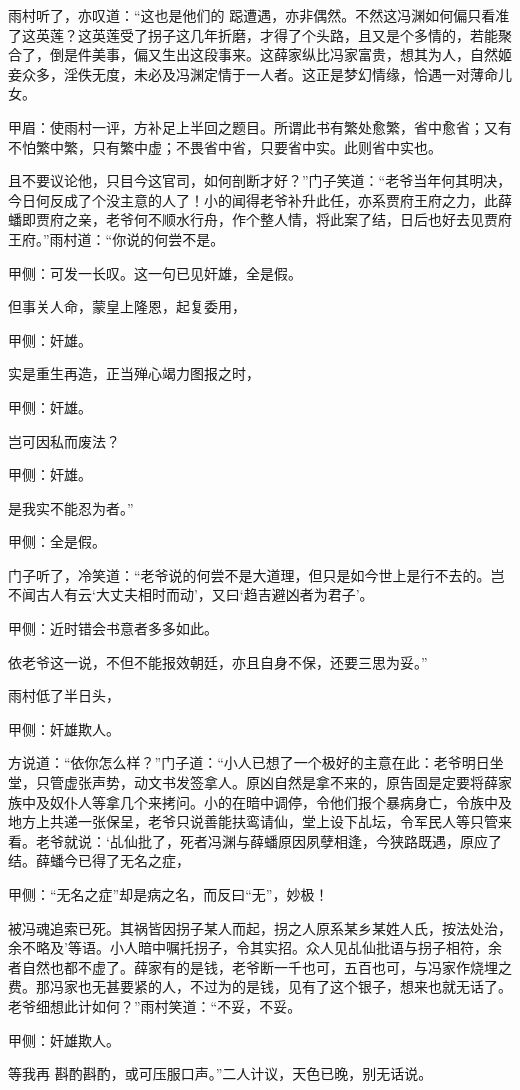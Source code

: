 \begin{parag}
    雨村听了，亦叹道：“这也是他们的 跽遭遇，亦非偶然。不然这冯渊如何偏只看准了这英莲？这英莲受了拐子这几年折磨，才得了个头路，且又是个多情的，若能聚合了，倒是件美事，偏又生出这段事来。这薛家纵比冯家富贵，想其为人，自然姬妾众多，淫佚无度，未必及冯渊定情于一人者。这正是梦幻情缘，恰遇一对薄命儿女。\begin{note}甲眉：使雨村一评，方补足上半回之题目。所谓此书有繁处愈繁，省中愈省；又有不怕繁中繁，只有繁中虚；不畏省中省，只要省中实。此则省中实也。\end{note}且不要议论他，只目今这官司，如何剖断才好？”门子笑道：“老爷当年何其明决，今日何反成了个没主意的人了！小的闻得老爷补升此任，亦系贾府王府之力，此薛蟠即贾府之亲，老爷何不顺水行舟，作个整人情，将此案了结，日后也好去见贾府王府。”雨村道：“你说的何尝不是。\begin{note}甲侧：可发一长叹。这一句已见奸雄，全是假。\end{note}但事关人命，蒙皇上隆恩，起复委用，\begin{note}甲侧：奸雄。\end{note}实是重生再造，正当殚心竭力图报之时，\begin{note}甲侧：奸雄。\end{note}岂可因私而废法？\begin{note}甲侧：奸雄。\end{note}是我实不能忍为者。”\begin{note}甲侧：全是假。\end{note}门子听了，冷笑道：“老爷说的何尝不是大道理，但只是如今世上是行不去的。岂不闻古人有云‘大丈夫相时而动’，又曰‘趋吉避凶者为君子’。\begin{note}甲侧：近时错会书意者多多如此。\end{note}依老爷这一说，不但不能报效朝廷，亦且自身不保，还要三思为妥。”
\end{parag}


\begin{parag}
    雨村低了半日头，\begin{note}甲侧：奸雄欺人。\end{note}方说道：“依你怎么样？”门子道：“小人已想了一个极好的主意在此：老爷明日坐堂，只管虚张声势，动文书发签拿人。原凶自然是拿不来的，原告固是定要将薛家族中及奴仆人等拿几个来拷问。小的在暗中调停，令他们报个暴病身亡，令族中及地方上共递一张保呈，老爷只说善能扶鸾请仙，堂上设下乩坛，令军民人等只管来看。老爷就说：‘乩仙批了，死者冯渊与薛蟠原因夙孽相逢，今狭路既遇，原应了结。薛蟠今已得了无名之症，\begin{note}甲侧：“无名之症”却是病之名，而反曰“无”，妙极！\end{note}被冯魂追索已死。其祸皆因拐子某人而起，拐之人原系某乡某姓人氏，按法处治，余不略及’等语。小人暗中嘱托拐子，令其实招。众人见乩仙批语与拐子相符，余者自然也都不虚了。薛家有的是钱，老爷断一千也可，五百也可，与冯家作烧埋之费。那冯家也无甚要紧的人，不过为的是钱，见有了这个银子，想来也就无话了。老爷细想此计如何？”雨村笑道：“不妥，不妥。\begin{note}甲侧：奸雄欺人。\end{note}等我再 斟酌斟酌，或可压服口声。”二人计议，天色已晚，别无话说。
\end{parag}


